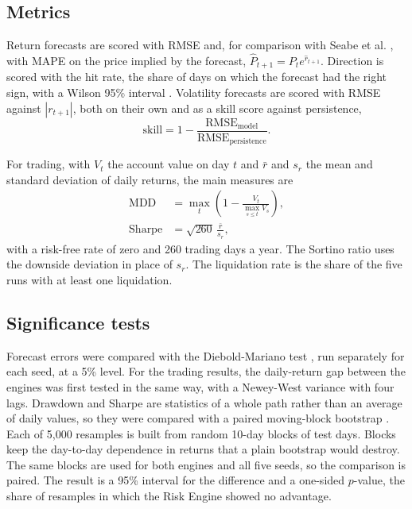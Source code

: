 \subsection{Metrics}\label{sec:metrics}

Return forecasts are scored with RMSE and, for comparison with Seabe et al. \cite{seabe2023}, with MAPE on the price implied by the forecast, $\hat P_{t+1}=P_t e^{\hat r_{t+1}}$. Direction is scored with the hit rate, the share of days on which the forecast had the right sign, with a Wilson 95\% interval \cite{wilson1927}. Volatility forecasts are scored with RMSE against $|r_{t+1}|$, both on their own and as a skill score against persistence,
\begin{equation}
  \text{skill} = 1 - \frac{\text{RMSE}_{\text{model}}}{\text{RMSE}_{\text{persistence}}}.
\end{equation}

For trading, with $V_t$ the account value on day $t$ and $\bar r$ and $s_r$ the mean and standard deviation of daily returns, the main measures are
\begin{align}
  \text{MDD} &= \max_t \left(1 - \frac{V_t}{\max_{s \le t} V_s}\right), \\
  \text{Sharpe} &= \sqrt{260}\,\frac{\bar r}{s_r},
\end{align}
with a risk-free rate of zero and 260 trading days a year. The Sortino ratio uses the downside deviation in place of $s_r$. The liquidation rate is the share of the five runs with at least one liquidation.

\subsection{Significance tests}\label{sec:tests}

Forecast errors were compared with the Diebold-Mariano test \cite{diebold1995}, run separately for each seed, at a 5\% level. For the trading results, the daily-return gap between the engines was first tested in the same way, with a Newey-West variance \cite{newey1987} with four lags. Drawdown and Sharpe are statistics of a whole path rather than an average of daily values, so they were compared with a paired moving-block bootstrap \cite{kunsch1989}. Each of 5{,}000 resamples is built from random 10-day blocks of test days. Blocks keep the day-to-day dependence in returns that a plain bootstrap would destroy. The same blocks are used for both engines and all five seeds, so the comparison is paired. The result is a 95\% interval for the difference and a one-sided $p$-value, the share of resamples in which the Risk Engine showed no advantage.

